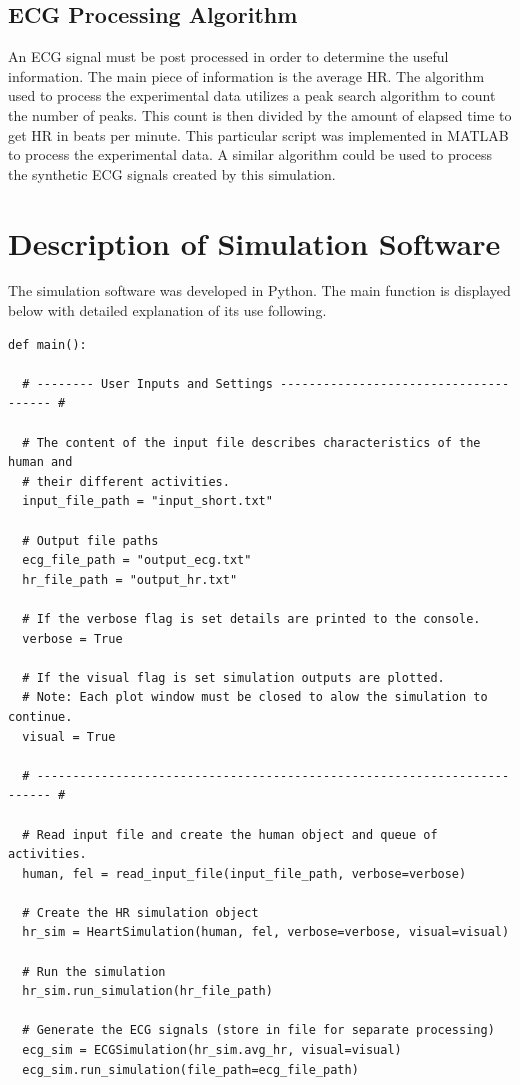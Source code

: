 \documentclass[paper=a4, fontsize=11pt]{scrartcl}
\numberwithin{equation}{section}		%
\numberwithin{figure}{section}			%
\numberwithin{table}{section}		    %
\begin{document}
\subsection{ECG Processing Algorithm}
An ECG signal must be post processed in order to determine the useful information. The main piece
of information is the average HR. The algorithm used to process the experimental data utilizes a
peak search algorithm to count the number of peaks. This count is then divided by the amount of 
elapsed time to get HR in beats per minute. This particular script was implemented in MATLAB to
process the experimental data. A similar algorithm could be used to process the synthetic ECG 
signals created by this simulation.

\section{Description of Simulation Software} \label{sec:software}
The simulation software was developed in Python. The main function is displayed below with detailed 
explanation of its use following.

\newpage
\lstset{language=Python}
\begin{lstlisting}[frame=single, caption={Simulation Main Function}]
def main():
	
  # -------- User Inputs and Settings -------------------------------------- #
	
  # The content of the input file describes characteristics of the human and
  # their different activities.
  input_file_path = "input_short.txt"

  # Output file paths
  ecg_file_path = "output_ecg.txt"
  hr_file_path = "output_hr.txt"

  # If the verbose flag is set details are printed to the console.
  verbose = True

  # If the visual flag is set simulation outputs are plotted.
  # Note: Each plot window must be closed to alow the simulation to continue.
  visual = True

  # ------------------------------------------------------------------------ #

  # Read input file and create the human object and queue of activities.
  human, fel = read_input_file(input_file_path, verbose=verbose)

  # Create the HR simulation object
  hr_sim = HeartSimulation(human, fel, verbose=verbose, visual=visual)

  # Run the simulation
  hr_sim.run_simulation(hr_file_path)

  # Generate the ECG signals (store in file for separate processing)
  ecg_sim = ECGSimulation(hr_sim.avg_hr, visual=visual)
  ecg_sim.run_simulation(file_path=ecg_file_path)
  
\end{lstlisting}
\vspace{2mm}
\end{document}

